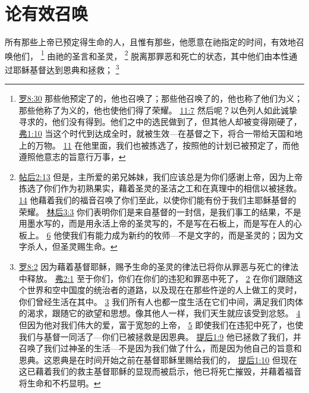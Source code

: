 \documentclass[12pt, a4paper, oneside]{ctexart}
\newcounter{parnum}[section]
\newcommand{\N}{%
   \noindent\refstepcounter{parnum}%
    \makebox[\parindent][l]{\textbf{\arabic{parnum}.}}}
\begin{document}
\section{论有效召唤}

\N 所有那些上帝已预定得生命的人，且惟有那些，他愿意在祂指定的时间，有效地召唤他们，
	\footnote {
		\href{https://biblehub.com/romans/8-30.htm}{罗8:30} 那些他预定了的，他也召唤了；那些他召唤了的，他也称了他们为义；那些他称了为义的，他也使他们得了荣耀。
		\href{https://biblehub.com/romans/11-7.htm}{11:7} 然后呢？以色列人如此诚挚寻求的，他们没有得到。他们之中的选民做到了，但其他人却被变得刚硬了，
		\href{https://biblehub.com/ephesians/1-10.htm}{弗1:10} 当这个时代到达成全时，就被生效---在基督之下，将合一带给天国和地上的万物。
		\href{https://biblehub.com/ephesians/1-11.htm}{11} 在他里面，我们也被拣选了，按照他的计划已被预定了，而他遵照他意志的旨意行万事，
	}
	由祂的圣言和圣灵，
	\footnote {
		\href{https://biblehub.com/2_thessalonians/2-13.htm}{帖后2:13} 但是，主所爱的弟兄姊妹，我们应该总是为你们感谢上帝，因为上帝拣选了你们作为初熟果实，藉着圣灵的圣洁之工和在真理中的相信以被拯救。
		\href{https://biblehub.com/2_thessalonians/2-14.htm}{14} 他藉着我们的福音召唤了你们至此，以使你们能有份于我们主耶稣基督的荣耀。
		\href{https://biblehub.com/2_corinthians/3-3.htm}{林后3:3} 你们表明你们是来自基督的一封信，是我们事工的结果，不是用墨水写的，而是用永活上帝的圣灵写的，不是写在石板上，而是写在人的心板上。
		\href{https://biblehub.com/2_corinthians/3-6.htm}{6} 他使我们有能力成为新约的牧师---不是文字的，而是圣灵的；因为文字杀人，但圣灵赐生命。
	}
	脱离那罪恶和死亡的状态，其中他们由本性通过耶稣基督达到恩典和拯救；
	\footnote {
		\href{https://biblehub.com/romans/8-2.htm}{罗8:2} 因为藉着基督耶稣，赐予生命的圣灵的律法已将你从罪恶与死亡的律法中释放。 
		\href{https://biblehub.com/ephesians/2-1.htm}{弗2:1} 至于你们，你们在你们的违犯和罪恶中死了， 
		\href{https://biblehub.com/ephesians/2-2.htm}{2} 在你们跟随这个世界和空中国度的统治者的道路，以及现在在那些忤逆的人上做工的灵时，你们曾经生活在其中。
		\href{https://biblehub.com/ephesians/2-3.htm}{3} 我们所有人也都一度生活在它们中间，满足我们肉体的渴求，跟随它的欲望和思想。像其他人一样，我们天生就应该受到忿怒。
		\href{https://biblehub.com/ephesians/2-4.htm}{4} 但因为他对我们伟大的爱，富于宽恕的上帝，
		\href{https://biblehub.com/ephesians/2-5.htm}{5} 即使我们在违犯中死了，也使我们与基督一同活了---你们已被拯救是因恩典。
		\href{https://biblehub.com/2_timothy/1-9.htm}{提后1:9} 他已拯救了我们，并召唤了我们过神圣的生活---不是因为我们做了什么，而是因为他自己的旨意和恩典。这恩典是在时间开始之前在基督耶稣里赐给我们的，
		\href{https://biblehub.com/2_timothy/1-10.htm}{提后1:10} 但现在这已藉着我们的救主基督耶稣的显现而被启示，他已将死亡摧毁，并藉着福音将生命和不朽显明。
	}
\end{document}
